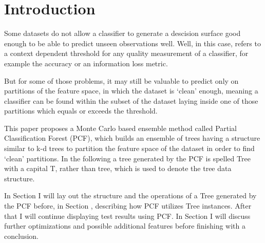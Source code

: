 \section{Introduction}

Some datasets do not allow a classifier to generate a
descision surface good enough to be able to predict unseen
observations well. Well, in this case, refers to a
context dependent threshold for any quality measurement of
a classifier, for example the accuracy or an information
loss metric.

But for some of those problems, it may still be valuable
to predict only on partitions of the feature space, in
which the dataset is `clean' enough, meaning a classifier
can be found within the subset of the dataset laying inside
one of those partitions which equals or exceeds the
threshold.

This paper proposes a Monte Carlo based ensemble method
called Partial Classification Forest (PCF), which builds an
ensemble of trees having a structure similar to
k-d trees to partition the feature space of the dataset in
order to find `clean' partitions. In the following a
tree generated by the PCF is spelled Tree with a capital
T, rather than tree, which is used to denote the tree data
structure.

In Section \MakeUppercase{} I will lay out
the structure and the operations of a Tree generated by the
PCF before, in Section \MakeUppercase{},
describing how PCF utilizes Tree instances. After that I
will continue displaying test results using PCF\@. In
Section \MakeUppercase{} I will discuss
further optimizations and possible additional features
before finishing with a conclusion.
